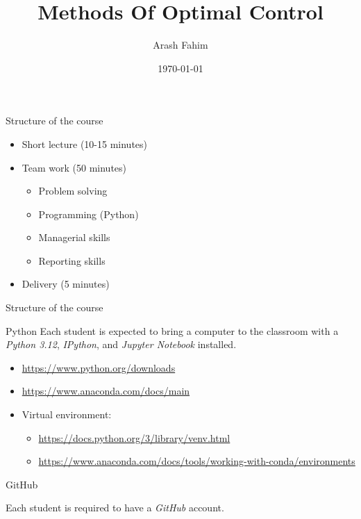 \documentclass[color=usenames,dvipsnames]{beamer}
\title[MAP~5210]{	
Methods Of Optimal Control}
\author{Arash Fahim}
\institute{FSU Fall 2025}
\date{\today}
\begin{document}
\begin{frame}
  \titlepage
\end{frame}

\begin{frame}{Structure of the course}
 \begin{itemize}[label = $\bullet$]
     \item Short lecture (10-15 minutes)
     \item Team work (50 minutes)
     \begin{itemize}[label = $\ast$]
         \item Problem solving 
         \item Programming (Python)
         \item Managerial skills
         \item Reporting skills
     \end{itemize}
     \item Delivery (5 minutes)
 \end{itemize}
\end{frame}

\begin{frame}{Structure of the course}
\begin{block}
    {Python}
    Each student is expected to bring a computer to the classroom with a \emph{Python 3.12}, \emph{IPython},  and \emph{Jupyter Notebook} installed.
    \begin{itemize}[label = $\bullet$]
        \item \url{https://www.python.org/downloads}
        \item \url{https://www.anaconda.com/docs/main}
        \item Virtual environment:
        \begin{itemize}
            \item \url{https://docs.python.org/3/library/venv.html}
            \item \url{https://www.anaconda.com/docs/tools/working-with-conda/environments}
        \end{itemize}
    \end{itemize}
\begin{block}
    {GitHub}
\end{block}
Each student is required to have a \emph{GitHub} account.
\end{block}
\end{frame}
\end{document}
